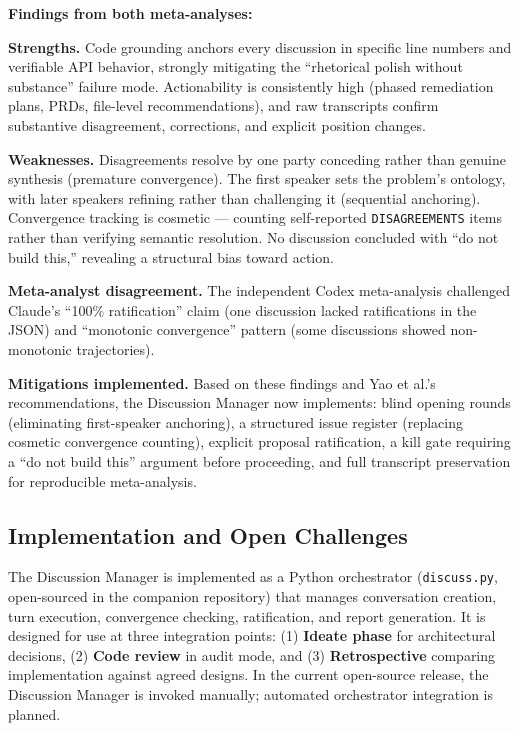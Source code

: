 \documentclass[11pt,a4paper]{article}
\begin{document}
\noindent\textbf{Findings from both meta-analyses:}

\textbf{Strengths.} Code grounding anchors every discussion in specific line numbers and verifiable API behavior, strongly mitigating the ``rhetorical polish without substance'' failure mode. Actionability is consistently high (phased remediation plans, PRDs, file-level recommendations), and raw transcripts confirm substantive disagreement, corrections, and explicit position changes.

\textbf{Weaknesses.} Disagreements resolve by one party conceding rather than genuine synthesis (premature convergence). The first speaker sets the problem's ontology, with later speakers refining rather than challenging it (sequential anchoring). Convergence tracking is cosmetic --- counting self-reported \texttt{DISAGREEMENTS} items rather than verifying semantic resolution. No discussion concluded with ``do not build this,'' revealing a structural bias toward action.

\textbf{Meta-analyst disagreement.} The independent Codex meta-analysis challenged Claude's ``100\% ratification'' claim (one discussion lacked ratifications in the JSON) and ``monotonic convergence'' pattern (some discussions showed non-monotonic trajectories).

\textbf{Mitigations implemented.} Based on these findings and Yao et al.'s recommendations, the Discussion Manager now implements: blind opening rounds (eliminating first-speaker anchoring), a structured issue register (replacing cosmetic convergence counting), explicit proposal ratification, a kill gate requiring a ``do not build this'' argument before proceeding, and full transcript preservation for reproducible meta-analysis.

\subsection{Implementation and Open Challenges}\label{sec:implementation-and-open-challenges}

The Discussion Manager is implemented as a Python orchestrator (\texttt{discuss.py}, open-sourced in the companion repository) that manages conversation creation, turn execution, convergence checking, ratification, and report generation. It is designed for use at three integration points: (1) \textbf{Ideate phase} for architectural decisions, (2) \textbf{Code review} in audit mode, and (3) \textbf{Retrospective} comparing implementation against agreed designs. In the current open-source release, the Discussion Manager is invoked manually; automated orchestrator integration is planned.
\end{document}
